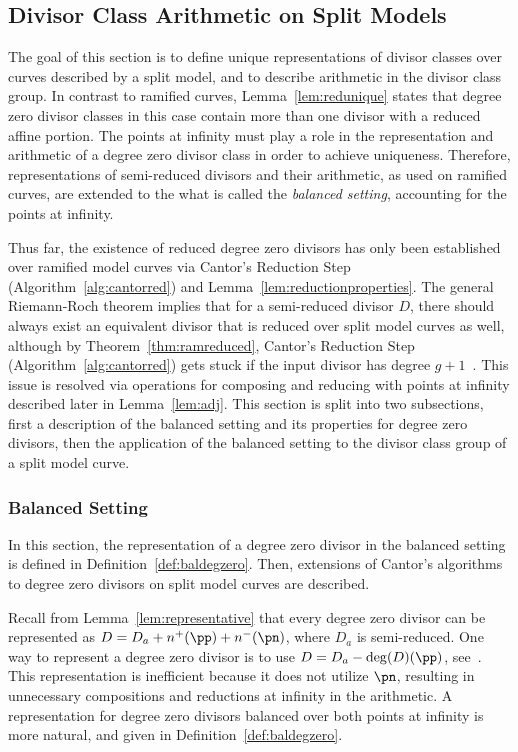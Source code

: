 \subsection{Divisor Class Arithmetic on Split Models}\label{sec:dcasplit} The
goal of this section is to define unique representations of divisor classes over
curves described by a split model, and to describe arithmetic in the divisor
class group. In contrast to ramified curves, Lemma~\ref{lem:redunique} states
that degree zero divisor classes in this case contain more than one divisor
with a reduced affine portion. The points at infinity must play a role in the
representation and arithmetic of a degree zero divisor class in order to achieve
uniqueness. Therefore, representations of semi-reduced divisors and their
arithmetic, as used on ramified curves, are extended to the what is called the
\emph{balanced setting}, accounting for the points at infinity. 

Thus far, the existence of reduced degree zero divisors has only been
established over ramified model curves via Cantor's Reduction Step
(Algorithm~\ref{alg:cantorred}) and Lemma~\ref{lem:reductionproperties}. The
general Riemann-Roch theorem implies that for a semi-reduced divisor $D$, there
should always exist an equivalent divisor that is reduced over split model
curves as well, although by Theorem~\ref{thm:ramreduced}, Cantor's Reduction
Step (Algorithm~\ref{alg:cantorred}) gets stuck if the input divisor has degree
$g +1$~\cite[Section~10.4.2]{Galbraith_PKC_2012}. This issue is resolved via
operations for composing and reducing with points at infinity described later in
Lemma~\ref{lem:adj}. This section is split into two subsections, first a
description of the balanced setting and its properties for degree zero divisors,
then the application of the balanced setting to the divisor class group of a
split model curve.

\subsubsection{Balanced Setting}
In this section, the representation of a degree zero divisor in the balanced
setting is defined in Definition~\ref{def:baldegzero}. Then, extensions of
Cantor's algorithms to degree zero divisors on split model curves are described.

Recall from Lemma~\ref{lem:representative} that every degree zero divisor can be
represented as $D = D_a + n^+(\pp) + n^-(\pn)$, where $D_a$ is semi-reduced.
One way to represent a degree zero divisor is to use $D = D_a -
\deg(D)(\pp)$, see~\cite{paulus1999real}. This representation is inefficient
because it does not utilize $\pn$, resulting in unnecessary compositions and
reductions at infinity in the arithmetic.  A representation for degree zero
divisors balanced over both points at infinity is more natural, and given in
Definition~\ref{def:baldegzero}. 

